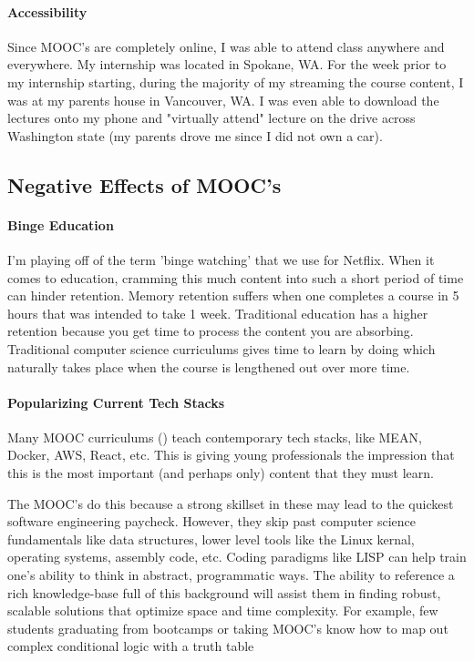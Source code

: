\paragraph{Accessibility}
Since MOOC's are completely online, I was able to attend class anywhere and everywhere. My internship was located in Spokane, WA. For the week prior to my internship starting, during the majority of my streaming the course content, I was at my parents house in Vancouver, WA. I was even able to download the lectures onto my phone and "virtually attend" lecture on the drive across Washington state (my parents drove me since I did not own a car).

\clearpage

\subsection{Negative Effects of MOOC's}

\paragraph{Binge Education}
I'm playing off of the term 'binge watching' that we use for Netflix. When it comes to education, cramming this much content into such a short period of time can hinder retention. Memory retention suffers when one completes a course in 5 hours that was intended to take 1 week. Traditional education has a higher retention because you get time to process the content you are absorbing. Traditional computer science curriculums gives time to learn by doing which naturally takes place when the course is lengthened out over more time.

\paragraph{Popularizing Current Tech Stacks}
Many MOOC curriculums () teach contemporary tech stacks, like MEAN, Docker, AWS, React, etc. This is giving young professionals the impression that this is the most important (and perhaps only) content that they must learn.

The MOOC's do this because a strong skillset in these may lead to the quickest software engineering paycheck. However, they skip past computer science fundamentals like data structures, lower level tools like the Linux kernal, operating systems, assembly code, etc. Coding paradigms like LISP can help train one's ability to think in abstract, programmatic ways. The ability to reference a rich knowledge-base full of this background will assist them in finding robust, scalable solutions that optimize space and time complexity. For example, few students graduating from bootcamps or taking MOOC's know how to map out complex conditional logic with a truth table

